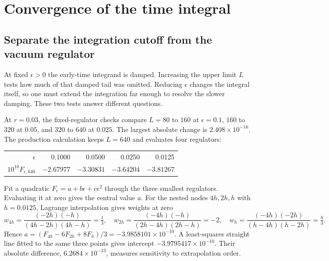 \clearpage\section{Convergence of the time integral}
\subsection{Separate the integration cutoff from the vacuum regulator}
At fixed $\epsilon>0$ the early-time integrand is damped. Increasing the upper limit $L$ tests how much of that damped tail was omitted. Reducing $\epsilon$ changes the integral itself, so one must extend the integration far enough to resolve the slower damping. These two tests answer different questions.

At $r=0.03$, the fixed-regulator checks compare $L=80$ to $160$ at $\epsilon=0.1$, $160$ to $320$ at $0.05$, and $320$ to $640$ at $0.025$. The largest absolute change is $2.408\times10^{-16}$. The production calculation keeps $L=640$ and evaluates four regulators:
\begin{center}\begin{tabular}{rrrrr}\toprule $\epsilon$ & 0.1000 & 0.0500 & 0.0250 & 0.0125\\
$10^{10} F_{\epsilon,640}$ & $-2.67977$ & $-3.30831$ & $-3.64204$ & $-3.81267$\\\bottomrule\end{tabular}\end{center}
Fit a quadratic $F_{\epsilon}=a+b\epsilon+c\epsilon^2$ through the three smallest regulators. Evaluating it at zero gives the central value $a$. For the nested nodes $4h,2h,h$ with $h=0.0125$, Lagrange interpolation gives weights at zero
\[
 w_{4h}=\frac{(-2h)(-h)}{(4h-2h)(4h-h)}=\tfrac13,\quad
 w_{2h}=\frac{(-4h)(-h)}{(2h-4h)(2h-h)}=-2,\quad
 w_h=\frac{(-4h)(-2h)}{(h-4h)(h-2h)}=\tfrac83 .
\]
Hence $a=(F_{4h}-6F_{2h}+8F_h)/3=-3.9858101\times10^{-10}$. A least-squares straight line fitted to the same three points gives intercept $-3.9795417\times10^{-10}$. Their absolute difference, $6.2684\times10^{-13}$, measures sensitivity to extrapolation order.

